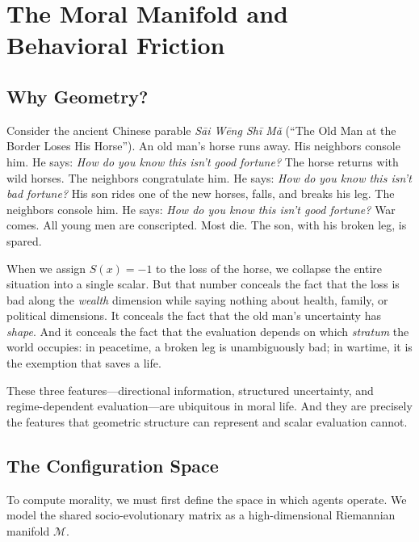 \documentclass[12pt]{article}
\theoremstyle{definition}
\theoremstyle{remark}
\newcommand{\M}{\mathcal{M}}
\begin{document}
\section{The Moral Manifold and Behavioral Friction}
\label{sec:manifold}

\subsection{Why Geometry?}

Consider the ancient Chinese parable \emph{S\={a}i W\={e}ng Sh\={i} M\v{a}} (``The Old Man at the Border Loses His Horse''). An old man's horse runs away. His neighbors console him. He says: \emph{How do you know this isn't good fortune?} The horse returns with wild horses. The neighbors congratulate him. He says: \emph{How do you know this isn't bad fortune?} His son rides one of the new horses, falls, and breaks his leg. The neighbors console him. He says: \emph{How do you know this isn't good fortune?} War comes. All young men are conscripted. Most die. The son, with his broken leg, is spared.

When we assign $S(x) = -1$ to the loss of the horse, we collapse the entire situation into a single scalar. But that number conceals the fact that the loss is bad along the \emph{wealth} dimension while saying nothing about health, family, or political dimensions. It conceals the fact that the old man's uncertainty has \emph{shape}. And it conceals the fact that the evaluation depends on which \emph{stratum} the world occupies: in peacetime, a broken leg is unambiguously bad; in wartime, it is the exemption that saves a life.

These three features---directional information, structured uncertainty, and regime-dependent evaluation---are ubiquitous in moral life. And they are precisely the features that geometric structure can represent and scalar evaluation cannot.

\subsection{The Configuration Space}

To compute morality, we must first define the space in which agents operate. We model the shared socio-evolutionary matrix as a high-dimensional Riemannian manifold $\M$.
\end{document}
